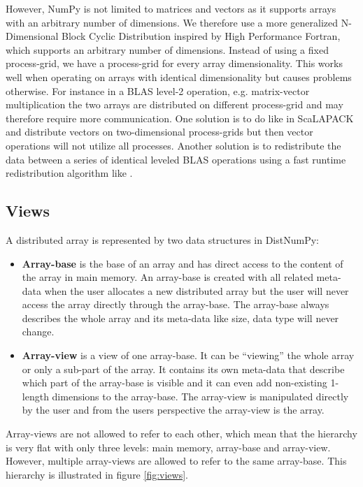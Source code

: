 \documentclass[10pt]{article}
\begin{document}
However, NumPy is not limited to matrices and vectors as it supports arrays with an arbitrary number of dimensions. We therefore use a more generalized N-Dimensional Block Cyclic Distribution inspired by High Performance Fortran\cite{Loveman93}, which supports an arbitrary number of dimensions. Instead of using a fixed process-grid, we have a process-grid for every array dimensionality. This works well when operating on arrays with identical dimensionality but causes problems otherwise. For instance in a BLAS level-2 operation, e.g. matrix-vector multiplication the two arrays are distributed on different process-grid and may therefore require more communication. One solution is to do like in ScaLAPACK and distribute vectors on two-dimensional process-grids but then vector operations will not utilize all processes. Another solution is to redistribute the data between a series of identical leveled BLAS operations using a fast runtime redistribution algorithm like \cite{PrylliT97}.


\subsection{Views}
A distributed array is represented by two data structures in DistNumPy:
\begin{itemize}
\item \textbf{Array-base} is the base of an array and has direct access to the content of the array in main memory. An array-base is created with all related meta-data when the user allocates a new distributed array but the user will never access the array directly through the array-base. The array-base always describes the whole array and its meta-data like size, data type will never change.
\item \textbf{Array-view} is a view of one array-base. It can be ``viewing'' the whole array or only a sub-part of the array. It contains its own meta-data that describe which part of the array-base is visible and it can even add non-existing 1-length dimensions to the array-base. The array-view is manipulated directly by the user and from the users perspective the array-view is the array.
\end{itemize}
Array-views are not allowed to refer to each other, which mean that the hierarchy is very flat with only three levels: main memory, array-base and array-view. However, multiple array-views are allowed to refer to the same array-base. This hierarchy is illustrated in figure \ref{fig:views}. 
\end{document}
